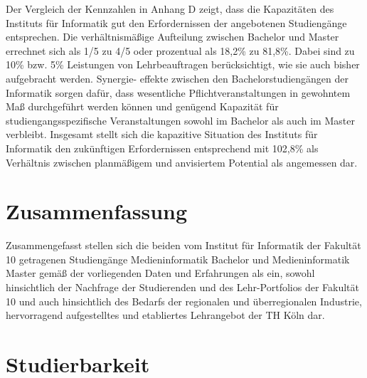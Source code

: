 Der Vergleich der Kennzahlen in Anhang D zeigt, dass die Kapazitäten des
Instituts für Informatik gut den Erfordernissen der angebotenen
Studiengänge entsprechen. Die verhältnismäßige Aufteilung zwischen
Bachelor und Master errechnet sich als 1/5 zu 4/5 oder prozentual als
18,2\% zu 81,8\%. Dabei sind zu 10\% bzw. 5\% Leistungen von
Lehrbeauftragen berücksichtigt, wie sie auch bisher aufgebracht werden.
Synergie- effekte zwischen den Bachelorstudiengängen der Informatik
sorgen dafür, dass wesentliche Pflichtveranstaltungen in gewohntem Maß
durchgeführt werden können und genügend Kapazität für
studiengangsspezifische Veranstaltungen sowohl im Bachelor als auch im
Master verbleibt. Insgesamt stellt sich die kapazitive Situation des
Instituts für Informatik den zukünftigen Erfordernissen entsprechend mit
102,8\% als Verhältnis zwischen planmäßigem und anvisiertem Potential
als angemessen dar.

\chapter{Zusammenfassung}\label{zusammenfassung}

Zusammengefasst stellen sich die beiden vom Institut für Informatik der
Fakultät 10 getragenen Studiengänge Medieninformatik Bachelor und
Medieninformatik Master gemäß der vorliegenden Daten und Erfahrungen als
ein, sowohl hinsichtlich der Nachfrage der Studierenden und des
Lehr-Portfolios der Fakultät 10 und auch hinsichtlich des Bedarfs der
regionalen und überregionalen Industrie, hervorragend aufgestelltes und
etabliertes Lehrangebot der TH Köln dar.

\chapter{Studierbarkeit}\label{studierbarkeit}

